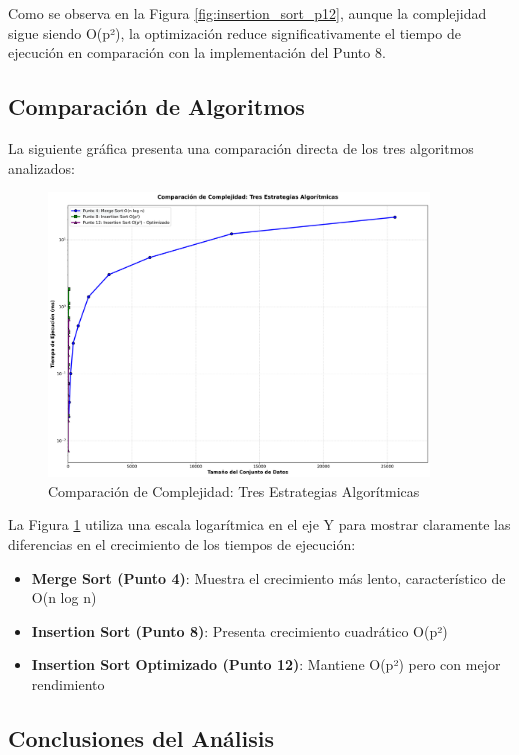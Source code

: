Como se observa en la Figura \ref{fig:insertion_sort_p12}, aunque la complejidad sigue siendo O(p²), la optimización reduce significativamente el tiempo de ejecución en comparación con la implementación del Punto 8.

\subsection{Comparación de Algoritmos}

La siguiente gráfica presenta una comparación directa de los tres algoritmos analizados:

\begin{figure}[h]
\centering
\includegraphics[width=0.9\textwidth]{grafica_comparativa_mejorada.png}
\caption{Comparación de Complejidad: Tres Estrategias Algorítmicas}
\label{fig:comparacion_algoritmos}
\end{figure}

La Figura \ref{fig:comparacion_algoritmos} utiliza una escala logarítmica en el eje Y para mostrar claramente las diferencias en el crecimiento de los tiempos de ejecución:

\begin{itemize}
    \item \textbf{Merge Sort (Punto 4)}: Muestra el crecimiento más lento, característico de O(n log n)
    \item \textbf{Insertion Sort (Punto 8)}: Presenta crecimiento cuadrático O(p²)
    \item \textbf{Insertion Sort Optimizado (Punto 12)}: Mantiene O(p²) pero con mejor rendimiento
\end{itemize}

\subsection{Conclusiones del Análisis}

